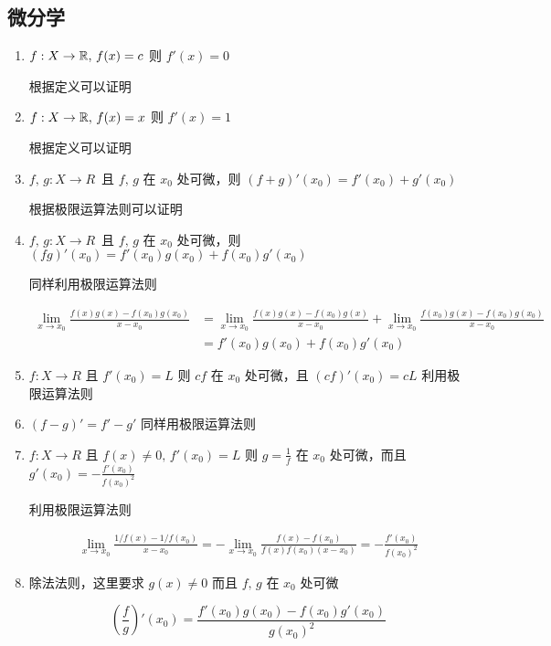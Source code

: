 \subsection{微分学}

\begin{enumerate}
    \item $f: X \to \mathbb{R},\, f(x) = c$ 则 $f'(x) = 0$

    根据定义可以证明

    \item $f: X \to \mathbb{R},\, f(x) = x $ 则 $f'(x) = 1$

    根据定义可以证明

    \item $f,\,g: X \to R\, $ 且 $f,\,g$ 在 $x_0$ 处可微，则 $ (f+g)'(x_0) = f'(x_0) + g'(x_0)$

    根据极限运算法则可以证明

    \item $f,\,g: X \to R\, $ 且 $f,\,g$ 在 $x_0$ 处可微，则 $ (fg)'(x_0) = f'(x_0)g(x_0) + f(x_0)g'(x_0)$

    同样利用极限运算法则

\begin{align*}
    \lim_{x \to x_0}\frac{f(x)g(x) - f(x_0)g(x_0)}{x-x_0} &= \lim_{x \to x_0}\frac{f(x)g(x) - f(x_0)g(x)}{x-x_0} + \lim_{x \to x_0}\frac{f(x_0)g(x) - f(x_0)g(x_0)}{x-x_0} \\
    &= f'(x_0)g(x_0) + f(x_0)g'(x_0)
\end{align*}


    \item $f: X \to R$ 且 $f'(x_0) = L$ 则 $cf$ 在 $x_0$ 处可微，且 $(cf)'(x_0) = cL$
    利用极限运算法则

    \item $(f-g)' = f' - g'$
    同样用极限运算法则

    \item $f: X \to R$ 且 $f(x) \ne 0,\, f'(x_0) = L$ 则 $g=\frac{1}{f}$ 在 $x_0$ 处可微，而且 $g'(x_0) = -\frac{f'(x_0)}{f(x_0)^2}$

    利用极限运算法则

\begin{align*}
    \lim_{x \to x_0}\frac{1/f(x) - 1/f(x_0)}{x-x_0} = - \lim_{x \to x_0}\frac{f(x) - f(x_0)}{f(x)f(x_0)(x-x_0)} = - \frac{f'(x_0)}{f(x_0)^2}
\end{align*}

    \item 除法法则，这里要求 $g(x) \ne 0$ 而且 $f,\,g$ 在 $x_0$ 处可微

\[
    (\frac{f}{g})'(x_0) = \frac{f'(x_0)g(x_0) - f(x_0)g'(x_0)}{g(x_0)^2}
\]
\end{enumerate}

